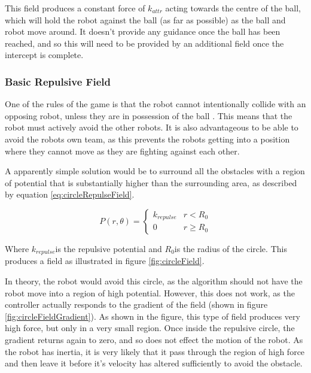 \documentclass[10pt]{article} \usepackage[a4paper]{geometry}
\begin{document}
This field produces a constant force of $k_{attr}$ acting towards the centre of
the ball, which will hold the robot against the ball (as far as possible) as the
ball and robot move around. It doesn't provide any guidance once the ball has
been reached, and so this will need to be provided by an additional field once
the intercept is complete.

\subsubsection{Basic Repulsive Field\label{sub:Basic-Repulsive-Field}}

One of the rules of the game is that the robot cannot intentionally collide with
an opposing robot, unless they are in possession of the ball
\cite{simurosotSim}. This means that the robot must actively avoid the other
robots. It is also advantageous to be able to avoid the robots own team, as this
prevents the robots getting into a position where they cannot move as they are
fighting against each other.

A apparently simple solution would be to surround all the obstacles with a
region of potential that is substantially higher than the surrounding area, as
described by equation \ref{eq:circleRepulseField}.

\begin{equation}
P\left(r,\theta\right)=\begin{cases}
k_{repulse} & r<R_{0}\\
0 & r\geq R_{0}
\end{cases}\label{eq:circleRepulseField}
\end{equation}

Where $k_{repulse}$is the repulsive potential and $R_{0}$is the radius of the
circle. This produces a field as illustrated in figure \ref{fig:circleField}.

In theory, the robot would avoid this circle, as the algorithm should not have
the robot move into a region of high potential. However, this does not work, as
the controller actually responds to the gradient of the field (shown in figure
\ref{fig:circleFieldGradient}). As shown in the figure, this type of field
produces very high force, but only in a very small region. Once inside the
repulsive circle, the gradient returns again to zero, and so does not effect the
motion of the robot. As the robot has inertia, it is very likely that it pass
through the region of high force and then leave it before it's velocity has
altered sufficiently to avoid the obstacle.
\end{document}
